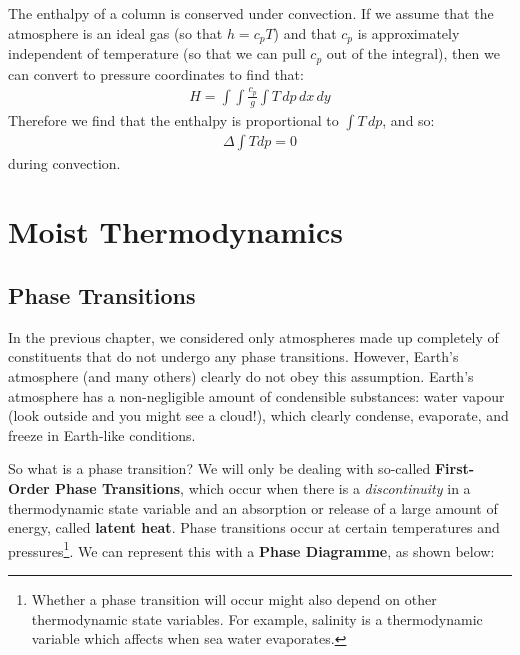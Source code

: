 The enthalpy of a column is conserved under convection. If we assume that the atmosphere is an ideal gas (so that $h=c_pT$) and that $c_p$ is approximately independent of temperature (so that we can pull $c_p$ out of the integral), then we can convert to pressure coordinates to find that:
\begin{align*}
    H =  \int \int \frac{c_p}{g} \int  T \,dp\,dx\,dy
\end{align*}
Therefore we find that the enthalpy is proportional to $\int T\,dp$, and so:
\begin{align}
    \boxed{
        \Delta \int T dp = 0
    }
\end{align}
during convection.

\chapter{Moist Thermodynamics}\label{Moist Thermodynamics}

\section{Phase Transitions}

In the previous chapter, we considered only atmospheres made up completely of constituents that do not undergo any phase transitions. However, Earth's atmosphere (and many others) clearly do not obey this assumption. Earth's atmosphere has a non-negligible amount of condensible substances: water vapour (look outside and you might see a cloud!), which clearly condense, evaporate, and freeze in Earth-like conditions.

So what is a phase transition? We will only be dealing with so-called \textbf{First-Order Phase Transitions}, which occur when there is a \textit{discontinuity} in a thermodynamic state variable and an absorption or release of a large amount of energy, called \textbf{latent heat}. Phase transitions occur at certain temperatures and pressures\footnote{Whether a phase transition will occur might also depend on other thermodynamic state variables. For example, salinity is a thermodynamic variable which affects when sea water evaporates.}. We can represent this with a \textbf{Phase Diagramme}, as shown below:

